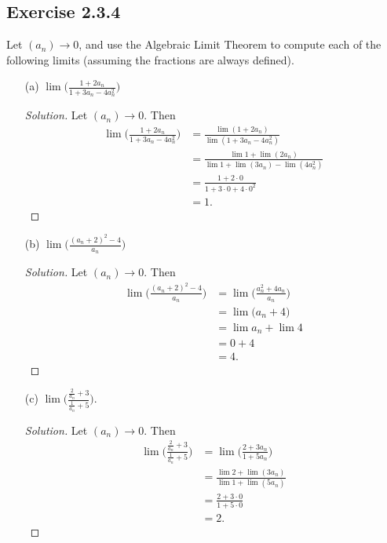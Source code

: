 \subsection{Exercise 2.3.4}
Let \( (a_n) \to 0\), and use the Algebraic Limit Theorem to compute each of the following limits (assuming the fractions are always defined).
\begin{enumerate}
    \item[(a)] \( \lim \Big( \frac{1 + 2a_n}{ 1 + 3a_n - 4a_n^2}   \Big) \)
        \begin{proof}[Solution]
        Let \( (a_n) \to 0\). Then
        \begin{align*}
            \lim \Big( \frac{ 1 + 2a_n}{ 1 + 3a_n - 4a_n^2 } \Big) &= \frac{ \lim (1 + 2a_n)}{ \lim (1 + 3a_n - 4a_n^2)} \\
                                 &= \frac{ \lim 1 + \lim (2a_n)}{ \lim 1 + \lim (3a_n) - \lim (4a_n^2)} \\
                                 &= \frac{ 1 + 2 \cdot 0}{ 1 + 3 \cdot 0 + 4 \cdot 0^2} \\
                                 &= 1.
        \end{align*}
        \end{proof}
    \item[(b)] \( \lim \Big( \frac{ (a_n + 2)^2 - 4}{a_n} \Big)\)
        \begin{proof}[Solution]
        Let \( (a_n) \to 0\). Then 
        \begin{align*}
          \lim  \Big( \frac{ (a_n + 2)^2 - 4}{ a_n} \Big)&= \lim \Big( \frac{a_n^2 + 4a_n}{a_n} \Big) \\
                                                 &= \lim \Big( a_n + 4 \Big) \\  
                                                 &= \lim a_n + \lim 4 \\ 
                                                 &= 0 + 4 \\ 
                                                 &= 4.
        \end{align*}
        \end{proof}
    \item[(c)] \( \lim \Big( \frac{ \frac{2}{a_n} + 3}{ \frac{1}{a_n} + 5} \Big)\).
        \begin{proof}[Solution]
        Let \( (a_n) \to 0\). Then 
        \begin{align*}
        \lim \Big( \frac{ \frac{2}{a_n} + 3}{ \frac{1}{a_n} + 5} \Big) &= \lim \Big( \frac{2 + 3a_n}{1 + 5a_n} \Big)  \\
                                                               &= \frac{ \lim 2 + \lim (3a_n)}{ \lim 1 + \lim (5a_n)} \\ 
                                                               &= \frac{2 + 3 \cdot 0}{ 1 + 5 \cdot 0}\\
                                                               &=2. 
        \end{align*}
        \end{proof}
\end{enumerate}

